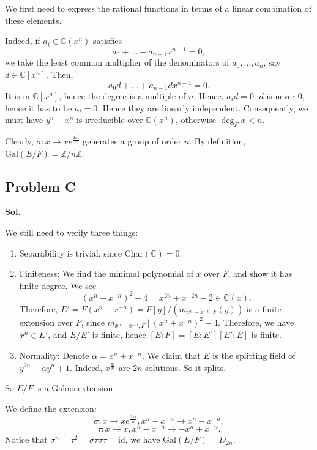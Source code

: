 \documentclass[lang=en,11pt,a4paper,citestyle =authoryear]{elegantpaper}
\begin{document}
We first need to express the rational functions in terms of a linear combination of these elements.

Indeed, if $a_i\in \mathbb C(x^n)$ satisfies 
$$a_0+\dots+a_{n-1}x^{n-1}=0,$$
we take the least common multiplier of the denominators of $a_0,\dots, a_n$, say $d\in \mathbb C[x^n]$. 
Then, 
$$a_0d+\dots+a_{n-1}dx^{n-1}=0.$$
It is in $\mathbb C[x^n]$, hence the degree is a multiple of $n$. Hence, $a_{i}d=0$. $d$ is never $0$, hence it has to be $a_i=0$. Hence they are linearly independent. Consequently, we must have $y^n-x^n$ is irreducible over $\mathbb C(x^n)$, otherwise $\deg_F x<n$.

Clearly, $\sigma: x\rightarrow xe^{\frac{2\pi i}{n}}$ generates a group of order $n$. By definition, $\text{Gal}(E/F)=\mathbb Z/n\mathbb Z$. 
\par 


\subsection*{Problem C}
\textbf{Sol.} \par
    We still need to verify three things:
\begin{enumerate}
\item Separability is trivial, since $\text{Char}(\mathbb C)=0$.
\item Finiteness: We find the minimal polynomial of $x$ over $F$, and show it has finite degree. 
We see $$(x^n+x^{-n})^2-4=x^{2n}+x^{-2n}-2\in \mathbb C(x).$$
Therefore, $E'=F(x^n-x^{-n})=F[y]/(m_{x^{n}-x^{-n}, F}(y))$ is a finite extension over $F$, since $m_{x^{n}-x^{-n}, F}\ |\ (x^n+x^{-n})^2-4$. Therefore, we have $x^n\in E'$, and $E/E'$ is finite, hence $[E:F]=[E:E'][E':E]$ is finite.
\item Normality: Denote $\alpha=x^n+x^{-n}$. We claim that $E$ is the splitting field of $y^{2n}-\alpha y^n+1$. Indeed, $x^\frac{\pi i}{n}$ are $2n$ solutions. So it splits.
\end{enumerate}
So $E/F$ is a Galois extension. 

We define the extension: $$\sigma: x\rightarrow xe^{\frac{2\pi i}{n}}, x^{n}-x^{-n}\rightarrow x^{n}-x^{-n},$$ $$\tau:x\rightarrow x, x^{n}-x^{-n}\rightarrow -x^{n}+x^{-n}.$$
Notice that $\sigma^n=\tau^2=\sigma\tau\sigma\tau=\text{id}$, we have $\text{Gal}(E/F)=D_{2n}$.
\par 
\end{document}
